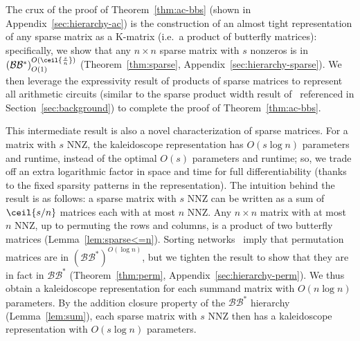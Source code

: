 The crux of the proof of Theorem~\ref{thm:ac-bbs} (shown in
Appendix~\ref{sec:hierarchy-ac}) is the construction of an almost tight representation of any sparse matrix as a K-matrix (i.e.\ a product of butterfly matrices): specifically, we show that any $n \times n$ sparse matrix with $s$ nonzeros is in $(\mathcal{B}\mathcal{B}^*)_{O(1)}^{O(\ceil{\frac{s}{n}})}$
(Theorem~\ref{thm:sparse}, Appendix~\ref{sec:hierarchy-sparse}).
We then leverage the expressivity result of products of sparse matrices to represent all arithmetic circuits (similar to the sparse product width result
of~\citet{desa2018two} referenced in Section~\ref{sec:background}) to complete the proof of
Theorem~\ref{thm:ac-bbs}.

This intermediate result is also a novel characterization of sparse matrices. For a matrix with $s$ NNZ, the kaleidoscope representation has $O(s \log n)$ parameters and runtime, instead of the optimal $O(s)$ parameters and runtime; so, we trade off an extra logarithmic factor in space and time for full differentiability (thanks to the fixed sparsity patterns in the representation). The intuition behind the result is as follows: a sparse matrix with $s$ NNZ can be written as a sum of $\ceil{s/n}$
matrices each with at most $n$ NNZ. Any $n \times n$ matrix with at most $n$ NNZ, up to permuting the rows and columns, is a product of two butterfly matrices (Lemma~\ref{lem:sparse<=n}).
Sorting networks~\citep{knuth1997art} imply that permutation matrices are in
$(\mathcal{B}\mathcal{B}^*)^{O(\log n)}$, but we tighten the result to show that they are in fact in
$\mathcal{B}\mathcal{B}^*$ (Theorem~\ref{thm:perm}, Appendix~\ref{sec:hierarchy-perm}).
We thus obtain a kaleidoscope representation for each summand matrix with $O(n \log n)$ parameters. By the addition closure property of the $\mathcal{B}\mathcal{B}^*$ hierarchy
(Lemma~\ref{lem:sum}), each sparse matrix with $s$ NNZ then has a kaleidoscope representation with $O(s \log n)$ parameters.

 

